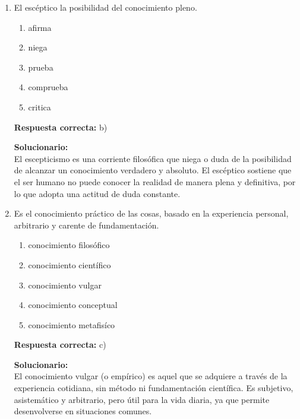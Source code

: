 \begin{enumerate}
 El reforzamiento positivo consiste en presentar un estímulo agradable (ir al cine) para incrementar una conducta deseada (hacer la tarea).
 Rebeca motiva a su hijo ofreciéndole una recompensa, lo cual aumenta la probabilidad de que cumpla con la tarea.
	
	
	
	\item El escéptico \underline{\hspace{1.5cm}} la posibilidad del conocimiento pleno.
	
	\begin{enumerate}[label=\alph*)]
		\item afirma
		\item niega
		\item prueba
		\item comprueba
		\item critica
	\end{enumerate}
	
	\textbf{Respuesta correcta:} b)
	
	
	\vspace{2mm}
	\textbf{Solucionario:}\\
	
	El escepticismo es una corriente filosófica que niega o duda de la posibilidad de alcanzar un conocimiento verdadero y absoluto.
	El escéptico sostiene que el ser humano no puede conocer la realidad de manera plena y definitiva, por lo que adopta una actitud de duda constante.


	\vspace{6mm}
	
	\item Es el conocimiento práctico de las cosas, basado en la experiencia personal, arbitrario y carente de fundamentación.
	\begin{enumerate}[label=\alph*)]
		\item conocimiento filosófico
		\item conocimiento científico
		\item conocimiento vulgar
		\item conocimiento conceptual
		\item conocimiento metafisíco
	\end{enumerate}
	
	\textbf{Respuesta correcta:} c)
		
		
		\vspace{2mm}
		\textbf{Solucionario:}\\
	
		El conocimiento vulgar (o empírico) es aquel que se adquiere a través de la experiencia cotidiana, sin método ni fundamentación científica.
		Es subjetivo, asistemático y arbitrario, pero útil para la vida diaria, ya que permite desenvolverse en situaciones comunes.
		
		
	\vspace{6mm}
		
\end{enumerate}





